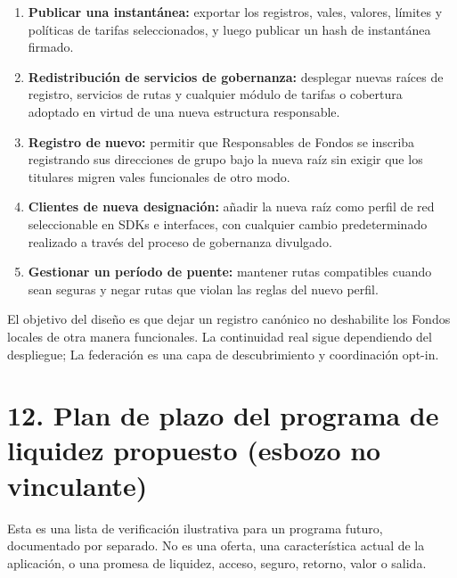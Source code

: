 \documentclass[11pt]{article}
\begin{document}
\begin{enumerate}[leftmargin=*]
\item \textbf{Publicar una instantánea:} exportar los registros, vales, valores, límites y políticas de tarifas seleccionados, y luego publicar un hash de instantánea firmado.
\item \textbf{Redistribución de servicios de gobernanza:} desplegar nuevas raíces de registro, servicios de rutas y cualquier módulo de tarifas o cobertura adoptado en virtud de una nueva estructura responsable.
\item \textbf{Registro de nuevo:} permitir que Responsables de Fondos se inscriba registrando sus direcciones de grupo bajo la nueva raíz sin exigir que los titulares migren vales funcionales de otro modo.
\item \textbf{Clientes de nueva designación:} añadir la nueva raíz como perfil de red seleccionable en SDKs e interfaces, con cualquier cambio predeterminado realizado a través del proceso de gobernanza divulgado.
\item \textbf{Gestionar un período de puente:} mantener rutas compatibles cuando sean seguras y negar rutas que violan las reglas del nuevo perfil.
\end{enumerate}
El objetivo del diseño es que dejar un registro canónico no deshabilite los Fondos locales de otra manera funcionales. La continuidad real sigue dependiendo del despliegue; La federación es una capa de descubrimiento y coordinación opt-in.


\section*{12. Plan de plazo del programa de liquidez propuesto (esbozo no vinculante)}

Esta es una lista de verificación ilustrativa para un programa futuro, documentado por separado. No es una oferta, una característica actual de la aplicación, o una promesa de liquidez, acceso, seguro, retorno, valor o salida.
\end{document}
